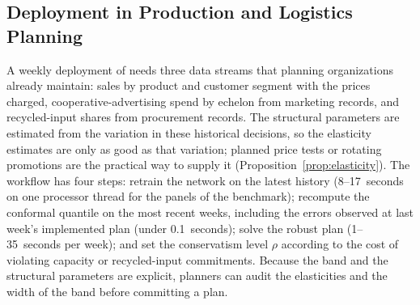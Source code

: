 \subsection{Deployment in Production and Logistics Planning}
\label{ssec:deploy}

A weekly deployment of \SIDNCRO needs three data streams that planning
organizations already maintain: sales by product and customer segment with the
prices charged, cooperative-advertising spend by echelon from marketing
records, and recycled-input shares from procurement records. The structural
parameters are estimated from the variation in these historical decisions, so
the elasticity estimates are only as good as that variation; planned price
tests or rotating promotions are the practical way to supply it
(Proposition~\ref{prop:elasticity}). The workflow has four steps: retrain the
network on the latest history (8--17~seconds on one processor thread for the panels
of the benchmark); recompute the conformal quantile on the most recent weeks,
including the errors observed at last week's implemented plan (under
0.1~seconds); solve the robust plan (1--35~seconds per week); and set the
conservatism level $\rho$ according to the cost of violating capacity or
recycled-input commitments. Because the band and the
structural parameters are explicit, planners can audit the elasticities and
the width of the band before committing a plan.
